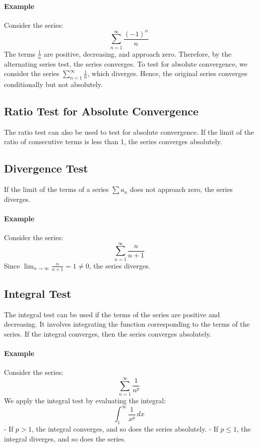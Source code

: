 \documentclass{article}
\begin{document}
\paragraph{Example}
Consider the series:
\[
\sum_{n=1}^\infty \frac{(-1)^n}{n}
\]
The terms \(\frac{1}{n}\) are positive, decreasing, and approach zero. Therefore, by the alternating series test, the series converges. To test for absolute convergence, we consider the series \(\sum_{n=1}^\infty \frac{1}{n}\), which diverges. Hence, the original series converges conditionally but not absolutely.

\subsection*{Ratio Test for Absolute Convergence}
The ratio test can also be used to test for absolute convergence. If the limit of the ratio of consecutive terms is less than 1, the series converges absolutely.

\subsection*{Divergence Test}
If the limit of the terms of a series \(\sum a_n\) does not approach zero, the series diverges.

\paragraph{Example}
Consider the series:
\[
\sum_{n=1}^\infty \frac{n}{n+1}
\]
Since \(\lim_{n \to \infty} \frac{n}{n+1} = 1 \neq 0\), the series diverges.

\subsection*{Integral Test}
The integral test can be used if the terms of the series are positive and decreasing. It involves integrating the function corresponding to the terms of the series. If the integral converges, then the series converges absolutely.

\paragraph{Example}
Consider the series:
\[
\sum_{n=1}^\infty \frac{1}{n^p}
\]
We apply the integral test by evaluating the integral:
\[
\int_1^\infty \frac{1}{x^p} \, dx
\]
- If \(p > 1\), the integral converges, and so does the series absolutely.
- If \(p \leq 1\), the integral diverges, and so does the series.
\end{document}
